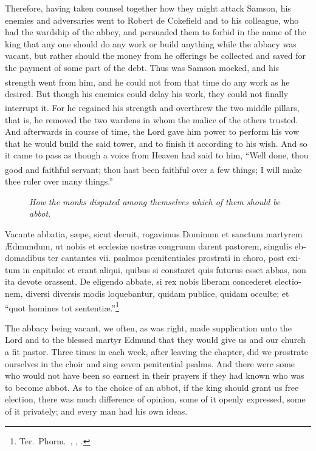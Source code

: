 \documentclass{book}
\newcounter{engnote}
\newcommand{\engnotenum}{\textsuperscript{\arabic{engnote}\stepcounter{engnote}}}
\newcommand{\blockhead}[4][]{
\begin{figure}
\centering
\vspace{#4}
\parbox{2.75cm}{\begin{center}\footnotesize \color{BrickRed} \emph{#2}\\ #1 \end{center}}
\end{figure}
}
\begin{document}
\begin{paracol}{2}
Therefore, having taken counsel together how they might attack Samson, his enemies and adversaries went to Robert de Cokefield and to his colleague, who had the wardship of the abbey, and persuaded them to forbid in the name of the king that any one should do any work or build anything while the abbacy was vacant, but rather should the money from he offerings be collected and saved for the payment of some part of the debt. Thus was Samson mocked, and his strength went from him,\engnotenum{} and he could not from that time do any work as he desired. But though his enemies could delay his work, they could not finally interrupt it. For he regained his strength and overthrew the two middle pillars,\engnotenum{} that is, he removed the two wardens in whom the malice of the others trusted. And afterwards in course of time, the Lord gave him power to perform his vow that he would build the said tower, and to finish it according to his wish. And so it came to pass as though a voice from Heaven had said to him, ``Well done, thou good and faithful servant;\engnotenum{} thou hast been faithful over a few things; I will make thee ruler over many things.''

\switchcolumn*

\begin{otherlanguage}{latin}
\blockhead{How the monks disputed among themselves which of them should be abbot.}{4}{-0.45cm}
Vacante abbatia, s\ae{}pe, sicut decuit, rogavimus Dominum et sanctum martyrem \AE{}dmundum, ut nobis et ecclesi\ae{} nostr\ae{} congruum darent pastorem, singulis ebdomadibus ter cantantes vii. psalmos p\oe{}nitentiales prostrati in choro, post exitum in capitulo: et erant aliqui, quibus si constaret quis futurus esset abbas, non ita devote orassent. De eligendo abbate, si rex nobis liberam concederet electionem, diversi diversis modis loquebantur, quidam publice, quidam occulte; et ``quot homines tot sententi\ae{}.''\footnote[\textdagger]{Ter.\ Phorm.\ , , .}

\end{otherlanguage}

\switchcolumn

The abbacy being vacant, we often, as was right, made supplication unto the Lord and to the blessed martyr Edmund that they would give us and our church a fit pastor. Three times in each week, after leaving the chapter, did we prostrate ourselves in the choir and sing seven penitential psalms. And there were some who would not have been so earnest in their prayers if they had known who was to become abbot. As to the choice of an abbot, if the king should grant us free election, there was much difference of opinion, some of it openly expressed, some of it privately; and every man had his own ideas.


\end{paracol}
\end{document}
